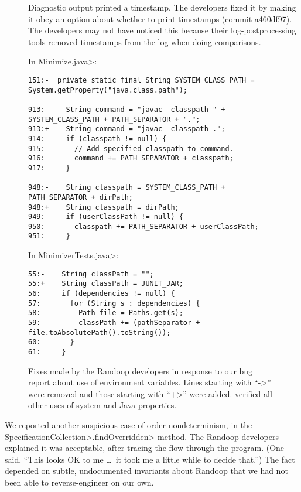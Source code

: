 \begin{description}
\begin{description}
\item[\bugTimestampOutput]
  Diagnostic output printed a timestamp.
  The developers fixed it by making it obey an
  option about whether to print timestamps (commit a460df97).
  The developers may not have noticed this because their log-postprocessing
  tools removed timestamps from the log when doing comparisons.

\end{description}

\end{description}

\begin{figure}

\noindent
In \<Minimize.java>:

\begin{Verbatim}
151:-  private static final String SYSTEM_CLASS_PATH = System.getProperty("java.class.path");

913:-    String command = "javac -classpath " + SYSTEM_CLASS_PATH + PATH_SEPARATOR + ".";
913:+    String command = "javac -classpath .";
914:     if (classpath != null) {
915:       // Add specified classpath to command.
916:       command += PATH_SEPARATOR + classpath;
917:     }

948:-    String classpath = SYSTEM_CLASS_PATH + PATH_SEPARATOR + dirPath;
948:+    String classpath = dirPath;
949:     if (userClassPath != null) {
950:       classpath += PATH_SEPARATOR + userClassPath;
951:     }
\end{Verbatim}

\noindent
In \<MinimizerTests.java>:

\begin{Verbatim}
55:-    String classPath = "";
55:+    String classPath = JUNIT_JAR;
56:     if (dependencies != null) {
57:       for (String s : dependencies) {
58:         Path file = Paths.get(s);
59:         classPath += (pathSeparator + file.toAbsolutePath().toString());
60:       }
61:     }
\end{Verbatim}
\caption{Fixes made by the Randoop developers in response to our bug report
  about use of environment variables.  Lines starting with ``\<->'' were
  removed and those starting with ``\<+>'' were added.
  \TheDeterminismChecker verified all other uses of system and Java properties.}
\label{fig:randoop-bug-getenv}
\end{figure}


We reported another suspicious case of order-nondeterminism, in the
\<SpecificationCollection>\-\<.findOverridden> method.  The Randoop developers explained it was
acceptable, after tracing the flow through the program.  (One said, ``This
looks OK to me \ldots\ it took me a little while to decide that.'')  The fact
depended on subtle, undocumented invariants about Randoop that we had not
been able to reverse-engineer on our own.




